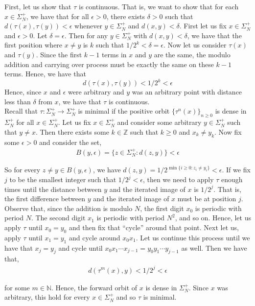 \documentclass[12pt]{article}
\newenvironment{problem}[2][Problem]{\begin{trivlist}
\item[\hskip \labelsep {\bfseries #1}\hskip \labelsep {\bfseries #2.}]}{\end{trivlist}}
\begin{document}
\begin{problem}{3}
\end{problem}

First, let us show that $\tau$ is continuous. That is, we want to show that for each $x \in \Sigma_N^+$, we have that for all $\epsilon > 0$, there exists $\delta > 0$ such that $d(\tau(x), \tau(y)) < \epsilon$ whenever $y \in \Sigma_N^+$ and $d(x, y) < \delta$. First let us fix $x \in \Sigma_N^+$ and $\epsilon > 0$. Let $\delta = \epsilon$. Then for any $y \in \Sigma_N^+$ with $d(x, y) < \delta$, we have that the first position where $x \neq y$ is $k$ such that $1/2^k < \delta = \epsilon$. Now let us consider $\tau(x)$ and $\tau(y)$. Since the first $k-1$ terms in $x$ and $y$ are the same, the modulo addition and carrying over process must be exactly the same on these $k-1$ terms. Hence, we have that $$d(\tau(x), \tau(y)) < 1/2^k < \epsilon$$ Hence, since $x$ and $\epsilon$ were arbitrary and $y$ was an arbitrary point with distance less than $\delta$ from $x$, we have that $\tau$ is continuous.\\

Recall that $\tau: \Sigma_N^+ \to \Sigma_N^+$ is minimal if the positive orbit $\{\tau^n(x)\}_{n \geq 0}$ is dense in $\Sigma_N^+$ for all $x \in \Sigma_N^+$. Let us fix $x \in \Sigma_N^+$ and consider some arbitrary $y \in \Sigma_N^+$ such that $y \neq x$. Then there exists some $k \in \mathbb{Z}$ such that $k \geq 0$ and $x_k \neq y_k$. Now fix some $\epsilon > 0$ and consider the set,
\begin{align*}
B(y, \epsilon) = \{z \in \Sigma_N^+: d(z, y)\} < \epsilon
\end{align*}

So for every $z \neq y \in B(y, \epsilon)$, we have $d(z, y) = 1/2^{\min \{i \geq 0: z_i \neq y_i\}} < \epsilon$. If we fix $j$ to be the smallest integer such that $1/2^j < \epsilon$, then we need to apply $\tau$ enough times until the distance between $y$ and the iterated image of $x$ is $1/2^j$. That is, the first difference between $y$ and the iterated image of $x$ must be at position $j$.\\

Observe that, since the addition is modulo $N$, the first digit $x_0$ is periodic with period $N$. The second digit $x_1$ is periodic with period $N^2$, and so on. Hence, let us apply $\tau$ until $x_0 = y_0$ and then fix that ``cycle'' around that point. Next let us, apply $\tau$ until $x_1 = y_1$ and cycle around $x_0x_1$. Let us continue this process until we have that $x_j = y_j$ and cycle until $x_0x_1\cdots x_{j-1} = y_0y_1 \cdots y_{j-1}$ as well. Then we have that,
\begin{align*}
d(\tau^m(x), y) < 1/2^j < \epsilon
\end{align*}

for some $m \in \mathbb{N}$. Hence, the forward orbit of $x$ is dense in $\Sigma_N^+$. Since $x$ was arbitrary, this hold for every $x \in \Sigma_N^+$ and so $\tau$ is minimal.
\end{document}
